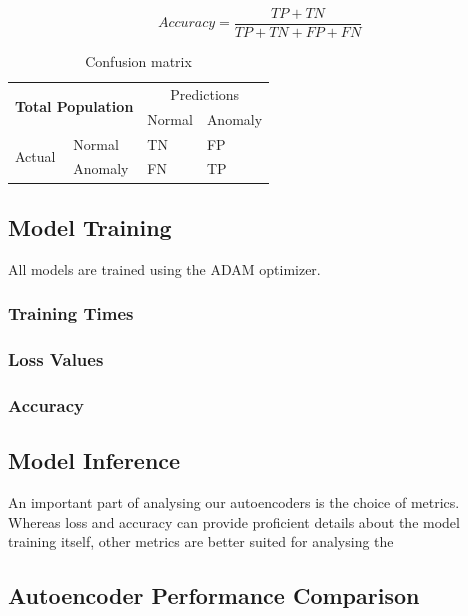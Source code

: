 \begin{equation}
    Accuracy = \frac{TP + TN}{TP + TN + FP + FN}
\end{equation}


\begin{table}[h]
\centering
\begin{tabular}{|ll|ll|}
\hline
\multicolumn{2}{|c|}{\multirow{2}{*}{\textbf{Total Population}}} & \multicolumn{2}{c|}{Predictions}      \\ \cline{3-4} 
\multicolumn{2}{|c|}{}                                           & \multicolumn{1}{l|}{Normal} & Anomaly \\ \hline
\multicolumn{1}{|l|}{\multirow{2}{*}{Actual}}      & Normal      & \multicolumn{1}{l|}{TN}     & FP      \\ \cline{2-4} 
\multicolumn{1}{|l|}{}                             & Anomaly     & \multicolumn{1}{l|}{FN}     & TP      \\ \hline
\end{tabular}
\label{tab:confmat}
\caption{Confusion matrix}
\end{table}


\subsection{Model Training}

All models are trained using the ADAM optimizer.


\subsubsection{Training Times}
\subsubsection{Loss Values}
\subsubsection{Accuracy}

\subsection{Model Inference}

An important part of analysing our autoencoders is the choice of metrics. Whereas loss and accuracy can provide proficient details about the model training itself, other metrics are better suited for analysing the 

\subsection{Autoencoder Performance Comparison}


